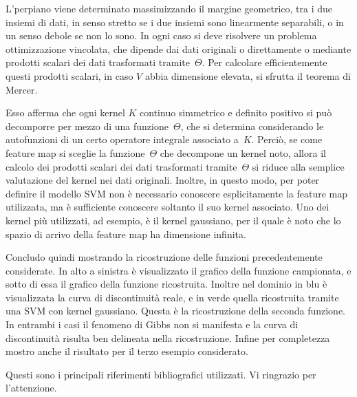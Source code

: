 L’perpiano viene determinato massimizzando il margine geometrico, tra i due insiemi di dati, in senso stretto se i due insiemi sono linearmente separabili, o in un senso debole se non lo sono.  In ogni caso si deve risolvere un problema ottimizzazione vincolata, che dipende dai dati originali o direttamente o  mediante prodotti scalari dei dati trasformati tramite~$\Theta$.   
Per calcolare efficientemente questi prodotti scalari, in caso $V$ abbia dimensione elevata, si sfrutta il teorema di Mercer.


Esso afferma che ogni kernel $K$ continuo simmetrico e definito positivo si può decomporre per mezzo di una funzione~$\Theta$, che si determina considerando le autofunzioni di un certo operatore integrale associato a~$K$.  Perciò, se come feature map si sceglie la funzione~$\Theta$ che decompone un kernel noto, allora il calcolo dei prodotti scalari dei dati trasformati tramite~$\Theta$ si riduce alla semplice valutazione del kernel nei dati originali.  Inoltre, in questo modo, per poter definire il modello SVM non è necessario conoscere esplicitamente la feature map utilizzata, ma è sufficiente conoscere soltanto il suo kernel associato.  Uno dei kernel più utilizzati, ad esempio, è il kernel gaussiano, per il quale è noto che lo spazio di arrivo della feature map ha dimensione infinita.

Concludo quindi mostrando la ricostruzione delle funzioni precedentemente considerate. In alto a sinistra è visualizzato il grafico della funzione campionata, e sotto di essa il grafico della funzione ricostruita.  Inoltre nel dominio in blu è visualizzata la curva di discontinuità reale, e in verde quella ricostruita tramite una SVM con kernel gaussiano.\nl
Questa è la ricostruzione della seconda funzione.  In entrambi i casi il fenomeno di Gibbs non si manifesta e la curva di discontinuità risulta ben delineata nella ricostruzione.\nl
Infine per completezza mostro anche il risultato per il terzo esempio considerato.

Questi sono i principali riferimenti bibliografici utilizzati.  Vi ringrazio per l’attenzione.



\bye
